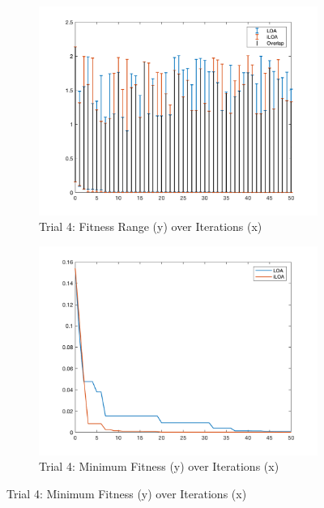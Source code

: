 \begin{figure}
  \begin{subfigure}[b]{0.4\textwidth}
    \includegraphics[width=\textwidth]{img/bars/f2/4}
    \caption{ \scriptsize Trial 4: Fitness Range (y) over Iterations (x)}
    \label{fig:f2-b-4}
  \end{subfigure}
  \begin{subfigure}[b]{0.4\textwidth}
    \includegraphics[width=\textwidth]{img/fits/f2/4}
    \caption{ \scriptsize Trial 4: Minimum Fitness (y) over Iterations (x)}
    \label{fig:f2-f-4}
  \end{subfigure}


\end{figure}
